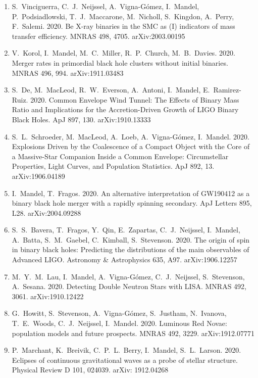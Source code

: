\documentclass[margin,line]{res}
\begin{document}
\begin{resume}
\begin{enumerate}
\item S.~Vinciguerra, C.~J.~Neijssel, A.~Vigna-G\'{o}mez, I.~Mandel, P.~Podsiadlowski, T.~J.~Maccarone, M.~Nicholl, S.~Kingdon, A.~Perry, F.~Salemi.  2020. Be X-ray binaries in the SMC as (I) indicators of mass transfer efficiency.  MNRAS 498, 4705.  arXiv:2003.00195

\item V.~Korol, I.~Mandel, M.~C.~Miller, R.~P.~Church, M.~B.~Davies. 2020. Merger rates in primordial black hole clusters without initial binaries. MNRAS 496, 994.  arXiv:1911.03483

\item S.~De, M.~MacLeod, R.~W.~Everson, A.~Antoni, I.~Mandel, E.~Ramirez-Ruiz.  2020.  Common Envelope Wind Tunnel: The Effects of Binary Mass Ratio and Implications for the Accretion-Driven Growth of LIGO Binary Black Holes.  ApJ 897, 130.  arXiv:1910.13333

\item S.~L.~Schroeder, M.~MacLeod, A.~Loeb, A.~Vigna-G\'{o}mez, I.~Mandel.  2020. Explosions Driven by the Coalescence of a Compact Object with the Core of a Massive-Star Companion Inside a Common Envelope: Circumstellar Properties, Light Curves, and Population Statistics.  ApJ 892, 13.  arXiv:1906.04189

\item I.~Mandel, T.~Fragos. 2020. An alternative interpretation of GW190412 as a binary black hole merger with a rapidly spinning secondary.  ApJ Letters 895, L28. arXiv:2004.09288

\item S.~S.~Bavera, T.~Fragos, Y.~Qin, E.~Zapartas, C.~J.~Neijssel, I.~Mandel, A.~Batta, S.~M.~Gaebel, C.~Kimball, S.~Stevenson.  2020.  The origin of spin in binary black holes: Predicting the distributions of the main observables of Advanced LIGO.  Astronomy \& Astrophysics 635, A97.  arXiv:1906.12257

\item M.~Y.~M.~Lau, I.~Mandel, A.~Vigna-G\'{o}mez, C.~J.~Neijssel, S.~Stevenson, A.~Sesana.  2020.  Detecting Double Neutron Stars with LISA.  MNRAS 492, 3061.  arXiv:1910.12422

\item G.~Howitt, S.~Stevenson, A.~Vigna-G\'{o}mez, S.~Justham, N.~Ivanova, T.~E.~Woods, C.~J.~Neijssel, I.~Mandel.  2020.  Luminous Red Novae: population models and future prospects.  MNRAS 492, 3229.  arXiv:1912.07771 

\item P.~Marchant, K.~Breivik, C.~P.~L.~Berry, I.~Mandel, S.~L.~Larson. 2020.  Eclipses of continuous gravitational waves as a probe of stellar structure.  Physical Review D 101, 024039.
arXiv: 1912.04268


\end{enumerate}
\end{resume}
\end{document}
